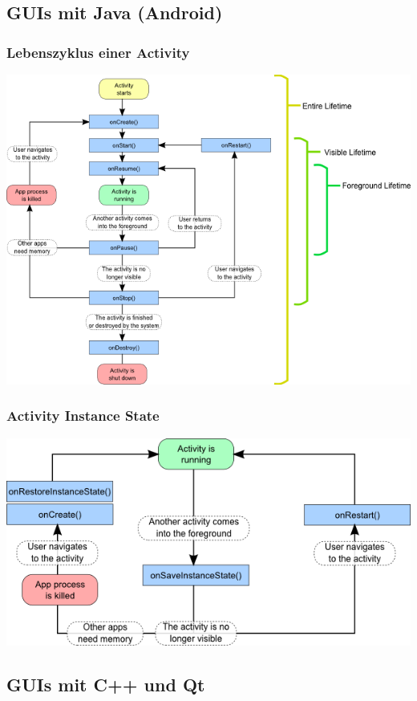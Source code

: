 \documentclass{scrartcl}
\begin{document}
\subsection{GUIs mit Java (Android)}

\subsubsection{Lebenszyklus einer Activity}

\includegraphics[scale=0.9]{figures/activity_lifecycle.png}

\subsubsection{Activity Instance State}

\includegraphics[scale=1]{figures/activity_instancestate.png}

\subsection{GUIs mit C++ und Qt}
\end{document}

